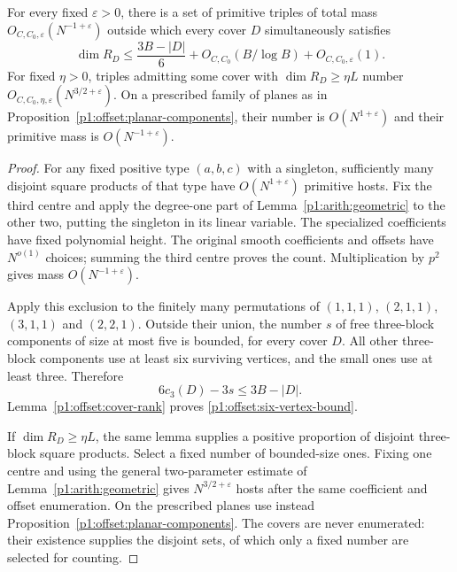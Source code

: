 \begin{proposition}
\label{p1:offset:six-vertex}
For every fixed $\varepsilon>0$, there is a set of primitive triples
of total mass $O_{C,C_0,\varepsilon}(N^{-1+\varepsilon})$ outside
which every cover $D$ simultaneously satisfies
\begin{equation}
 \dim R_D\le\frac{3B-|D|}{6}
           +O_{C,C_0}(B/\log B)+O_{C,C_0,\varepsilon}(1).
 \label{p1:offset:six-vertex-bound}
\end{equation}
For fixed $\eta>0$, triples admitting some cover with
$\dim R_D\ge\eta L$ number $O_{C,C_0,\eta,\varepsilon}(N^{3/2+\varepsilon})$.
On a prescribed family of planes as in
Proposition~\ref{p1:offset:planar-components}, their number is
$O(N^{1+\varepsilon})$ and their primitive mass is
$O(N^{-1+\varepsilon})$.
\end{proposition}
\begin{proof}
For any fixed positive type $(a,b,c)$ with a singleton, sufficiently
many disjoint square products of that type have $O(N^{1+\varepsilon})$
primitive hosts. Fix the third centre and apply the degree-one part
of Lemma~\ref{p1:arith:geometric} to the other two, putting the
singleton in its linear variable. The specialized coefficients have
fixed polynomial height. The original smooth coefficients and offsets
have $N^{o(1)}$ choices; summing the third centre proves the count.
Multiplication by $p^2$ gives mass $O(N^{-1+\varepsilon})$.

Apply this exclusion to the finitely many permutations of
$(1,1,1)$, $(2,1,1)$, $(3,1,1)$ and $(2,2,1)$.
Outside their union, the number $s$ of free three-block components
of size at most five is bounded, for every cover $D$.
All other three-block components use at least six surviving vertices,
and the small ones use at least three. Therefore
\[
 6c_3(D)-3s\le3B-|D|.
\]
Lemma~\ref{p1:offset:cover-rank} proves
\eqref{p1:offset:six-vertex-bound}.

If $\dim R_D\ge\eta L$, the same lemma supplies a positive
proportion of disjoint three-block square products. Select a fixed
number of bounded-size ones. Fixing one centre and using the general
two-parameter estimate of Lemma~\ref{p1:arith:geometric} gives
$N^{3/2+\varepsilon}$ hosts after the same coefficient and offset
enumeration. On the prescribed planes use instead
Proposition~\ref{p1:offset:planar-components}.
The covers are never enumerated: their existence supplies the disjoint
sets, of which only a fixed number are selected for counting.
\end{proof}
